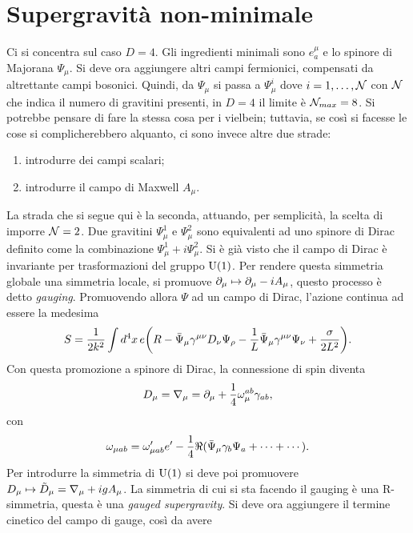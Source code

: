 \section{Supergravità non-minimale}
Ci si concentra sul caso $D = 4$. Gli ingredienti minimali sono $e_a^\mu$ e lo spinore di Majorana $\Psi_\mu$. Si deve ora aggiungere altri campi fermionici, compensati da altrettante campi bosonici. Quindi, da $\Psi_\mu$ si passa a $\Psi_\mu^i$ dove $i = 1,\dots,\mathcal{N}$ con $\mathcal{N}$ che indica il numero di gravitini presenti, in $D = 4$ il limite è $\mathcal{N}_{max} = 8$. Si potrebbe pensare di fare la stessa cosa per i vielbein; tuttavia, se così si facesse le cose si complicherebbero alquanto, ci sono invece altre due strade:
\begin{enumerate}
    \item introdurre dei campi scalari;
    \item introdurre il campo di Maxwell $A_\mu$.
\end{enumerate}
La strada che si segue qui è la seconda, attuando, per semplicità, la scelta di imporre $\mathcal{N} = 2$. Due gravitini $\Psi_\mu^1$ e $\Psi_\mu^2$ sono equivalenti ad uno spinore di Dirac definito come la combinazione $\Psi_\mu^1 + i\Psi_\mu^2$. Si è già visto che il campo di Dirac è invariante per trasformazioni del gruppo $\mathrm{U}(1)$. Per rendere questa simmetria globale una simmetria locale, si promuove $\partial_\mu \mapsto \partial_\mu - iA_\mu$, questo processo è detto \emph{gauging}. Promuovendo allora $\Psi$ ad un campo di Dirac, l'azione continua ad essere la medesima
\begin{equation}
    S = \frac{1}{2k^2}\int d^4x\,e\bigg(R - \bar{\Psi}_\mu\gamma^{\mu\nu}D_\nu\Psi_\rho - \frac{1}{L}\bar{\Psi}_\mu\gamma^{\mu\nu}\Psi_\nu + \frac{\sigma}{2L^2}\bigg).
\end{equation}
Con questa promozione a spinore di Dirac, la connessione di spin diventa 
\begin{equation}
    D_\mu = \nabla_\mu = \partial_\mu + \frac{1}{4}\omega^{ab}_\mu\gamma_{ab},
\end{equation}
con 
\begin{equation}
    \omega_{\mu ab} = \omega_{\mu ab}'e' - \frac{1}{4}\Re{(\bar{\Psi}_\mu\gamma_b\Psi_a + \cdots + \cdots)}.
\end{equation}
Per introdurre la simmetria di $\mathrm{U}(1)$ si deve poi promuovere $D_\mu \mapsto \tilde{D}_\mu = \nabla_\mu + igA_\mu$. La simmetria di cui si sta facendo il gauging è una R-simmetria, questa è una \emph{gauged supergravity}. Si deve ora aggiungere il termine cinetico del campo di gauge, così da avere 
